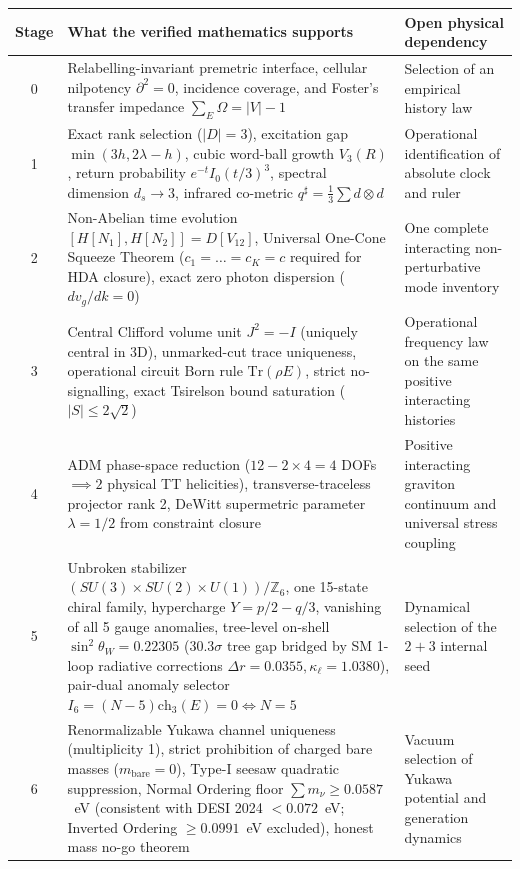 \documentclass[11pt]{article}
\theoremstyle{definition}
\theoremstyle{remark}
\begin{document}
\begin{table}[ht]
\centering\small
\begin{tabularx}{\textwidth}{@{}c Y Y@{}}
\toprule
Stage & What the verified mathematics supports & Open physical dependency \\
 & Relabelling-invariant premetric interface, cellular nilpotency $\partial^2=0$, incidence coverage, and Foster's transfer impedance $\sum_E \Omega = |V|-1$ & Selection of an empirical history law \\
1 & Exact rank selection ($|D|=3$), excitation gap $\min(3h, 2\lambda-h)$, cubic word-ball growth $V_3(R)$, return probability $e^{-t}I_0(t/3)^3$, spectral dimension $d_s \to 3$, infrared co-metric $q^\sharp = \frac{1}{3}\sum d\otimes d$ & Operational identification of absolute clock and ruler \\
2 & Non-Abelian time evolution $[H[N_1], H[N_2]] = D[V_{12}]$, Universal One-Cone Squeeze Theorem ($c_1 = \dots = c_K = c$ required for HDA closure), exact zero photon dispersion ($dv_g/dk=0$) & One complete interacting non-perturbative mode inventory \\
3 & Central Clifford volume unit $J^2=-I$ (uniquely central in 3D), unmarked-cut trace uniqueness, operational circuit Born rule $\mathrm{Tr}(\rho E)$, strict no-signalling, exact Tsirelson bound saturation ($|S|\le 2\sqrt{2}$) & Operational frequency law on the same positive interacting histories \\
4 & ADM phase-space reduction ($12 - 2\times 4 = 4$ DOFs $\implies 2$ physical TT helicities), transverse-traceless projector rank 2, DeWitt supermetric parameter $\lambda = 1/2$ from constraint closure & Positive interacting graviton continuum and universal stress coupling \\
5 & Unbroken stabilizer $(SU(3)\times SU(2)\times U(1))/\mathbb{Z}_6$, one 15-state chiral family, hypercharge $Y=p/2-q/3$, vanishing of all 5 gauge anomalies, tree-level on-shell $\sin^2\theta_W=0.22305$ ($30.3\sigma$ tree gap bridged by SM 1-loop radiative corrections $\Delta r=0.0355, \kappa_\ell=1.0380$), pair-dual anomaly selector $I_6=(N-5)\mathrm{ch}_3(E)=0 \iff N=5$ & Dynamical selection of the $2+3$ internal seed \\
6 & Renormalizable Yukawa channel uniqueness (multiplicity 1), strict prohibition of charged bare masses ($m_{\mathrm{bare}}=0$), Type-I seesaw quadratic suppression, Normal Ordering floor $\sum m_\nu \ge 0.0587$~eV (consistent with DESI 2024 $< 0.072$~eV; Inverted Ordering $\ge 0.0991$~eV excluded), honest mass no-go theorem & Vacuum selection of Yukawa potential and generation dynamics \\

\end{tabularx}
\end{table}
\end{document}
